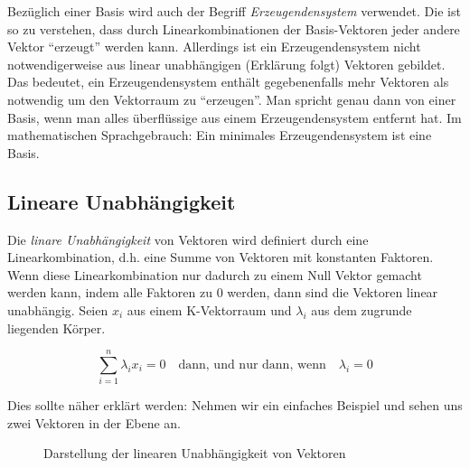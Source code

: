 Bezüglich einer Basis wird auch der Begriff \textsl{Erzeugendensystem} verwendet. Die ist so zu verstehen, dass durch Linearkombinationen der Basis-Vektoren jeder andere Vektor "`erzeugt"' werden kann. Allerdings ist ein Erzeugendensystem nicht notwendigerweise aus linear unabhängigen (Erklärung folgt) Vektoren gebildet. Das bedeutet, ein Erzeugendensystem enthält gegebenenfalls mehr Vektoren als notwendig um den Vektorraum zu "`erzeugen"'. Man spricht genau dann von einer Basis, wenn man alles überflüssige aus einem Erzeugendensystem entfernt hat. Im mathematischen Sprachgebrauch: Ein minimales Erzeugendensystem ist eine Basis.

\subsection{Lineare Unabhängigkeit}

\begin{definition}
Die \textsl{linare Unabhängigkeit}  von Vektoren wird definiert durch eine Linearkombination, d.h. eine Summe von Vektoren mit konstanten Faktoren. Wenn diese Linearkombination nur dadurch zu einem Null Vektor gemacht werden kann, indem alle Faktoren zu 0 werden, dann sind die Vektoren linear unabhängig. Seien $x_i$ aus einem K-Vektorraum und $\lambda_i $ aus dem zugrunde liegenden Körper. 

\begin{equation}\label{eq:linunabh}
\sum_{i=1}^{n} \lambda_i x_i = 0 \quad \text{dann, und nur dann, wenn} \quad \lambda_i = 0
\end{equation}
\end{definition}

Dies sollte näher erklärt werden: Nehmen wir ein einfaches Beispiel und sehen uns zwei Vektoren in der Ebene an. 

\bigskip

\begin{figure}
\begin{center}
\caption[Lineare Unabhängigkeit von Vektoren]{Darstellung der linearen Unabhängigkeit von Vektoren}
\end{center}
\end{figure}

